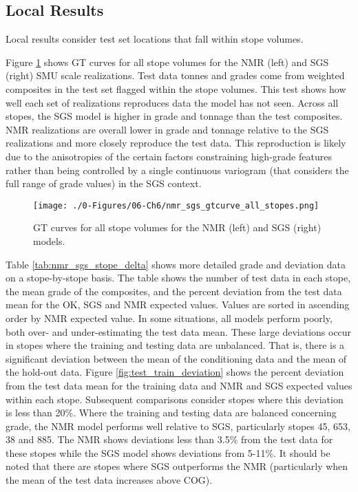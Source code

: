 \FloatBarrier
\subsection{Local Results}
\label{subsec:local}

Local results consider test set locations that fall within stope volumes.

Figure \ref{fig:nmr_sgs_gtcurve_all_stopes} shows \gls{GT} curves for all stope volumes for the \gls{NMR} (left) and \gls{SGS} (right) \gls{SMU} scale realizations. Test data tonnes and grades come from weighted composites in the test set flagged within the stope volumes. This test shows how well each set of realizations reproduces data the model has not seen. Across all stopes, the \gls{SGS} model is higher in grade and tonnage than the test composites. \gls{NMR} realizations are overall lower in grade and tonnage relative to the \gls{SGS} realizations and more closely reproduce the test data. This reproduction is likely due to the anisotropies of the certain factors constraining high-grade features rather than being controlled by a single continuous variogram (that considers the full range of grade values) in the \gls{SGS} context.

\begin{figure}[htb!]
    \centering
    \texttt{[image: ./0-Figures/06-Ch6/nmr\_sgs\_gtcurve\_all\_stopes.png]}
    \caption{\Gls{GT} curves for all stope volumes for the \gls{NMR} (left) and \gls{SGS} (right) models. }
    \label{fig:nmr_sgs_gtcurve_all_stopes}
\end{figure}

Table \ref{tab:nmr_sgs_stope_delta} shows more detailed grade and deviation data on a stope-by-stope basis. The table shows the number of test data in each stope, the mean grade of the composites, and the percent deviation from the test data mean for the \gls{OK}, \gls{SGS} and \gls{NMR} expected values. Values are sorted in
ascending order by \gls{NMR} expected value. In some situations, all models perform poorly, both over- and under-estimating the test data mean. These large deviations occur in stopes where the training and testing data are unbalanced. That is, there is a significant deviation between the mean of the conditioning data and the mean of the hold-out data. Figure \ref{fig:test_train_deviation} shows the percent deviation from the test data mean for the training data and \gls{NMR} and \gls{SGS} expected values within each stope. Subsequent comparisons consider stopes where this deviation is less than 20\%. Where the training and testing data are balanced concerning grade, the \gls{NMR} model performs well relative to \gls{SGS}, particularly stopes 45, 653, 38 and 885. The \gls{NMR} shows deviations less than 3.5\% from the test data for these stopes while the \gls{SGS} model shows deviations from 5-11\%. It should be noted that there are stopes where \gls{SGS} outperforms the \gls{NMR} (particularly when the mean of the test data increases above \gls{COG}).


